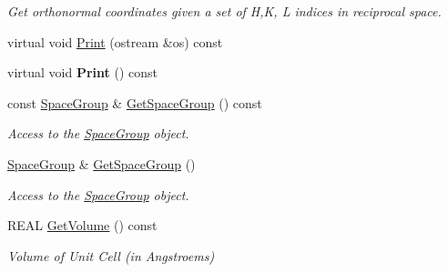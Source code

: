 \begin{DoxyCompactItemize}
\begin{DoxyCompactList}\small\item\em Get orthonormal coordinates given a set of H,K, L indices in reciprocal space. \end{DoxyCompactList}\item 
virtual void \mbox{\hyperlink{class_obj_cryst_1_1_unit_cell_a19ef2e012dfd628935a22b40a9c85957}{Print}} (ostream \&os) const
\item 
\mbox{\label{class_obj_cryst_1_1_unit_cell_ab77620664bf5fc9d3a7f7a124c897872}} 
virtual void {\bfseries Print} () const
\item 
\mbox{\label{class_obj_cryst_1_1_unit_cell_aa7d18fa157c16e2d084c3e403317d2ab}} 
const \mbox{\hyperlink{class_obj_cryst_1_1_space_group}{Space\+Group}} \& \mbox{\hyperlink{class_obj_cryst_1_1_unit_cell_aa7d18fa157c16e2d084c3e403317d2ab}{Get\+Space\+Group}} () const
\begin{DoxyCompactList}\small\item\em Access to the \mbox{\hyperlink{class_obj_cryst_1_1_space_group}{Space\+Group}} object. \end{DoxyCompactList}\item 
\mbox{\label{class_obj_cryst_1_1_unit_cell_a7ec74227a690553496cb2331ebe8c8d8}} 
\mbox{\hyperlink{class_obj_cryst_1_1_space_group}{Space\+Group}} \& \mbox{\hyperlink{class_obj_cryst_1_1_unit_cell_a7ec74227a690553496cb2331ebe8c8d8}{Get\+Space\+Group}} ()
\begin{DoxyCompactList}\small\item\em Access to the \mbox{\hyperlink{class_obj_cryst_1_1_space_group}{Space\+Group}} object. \end{DoxyCompactList}\item 
\mbox{\label{class_obj_cryst_1_1_unit_cell_a4d66d2f06b1472cb2e9e77e4d2c0ee75}} 
R\+E\+AL \mbox{\hyperlink{class_obj_cryst_1_1_unit_cell_a4d66d2f06b1472cb2e9e77e4d2c0ee75}{Get\+Volume}} () const
\begin{DoxyCompactList}\small\item\em Volume of Unit Cell (in Angstroems) \end{DoxyCompactList}\end{DoxyCompactItemize}

